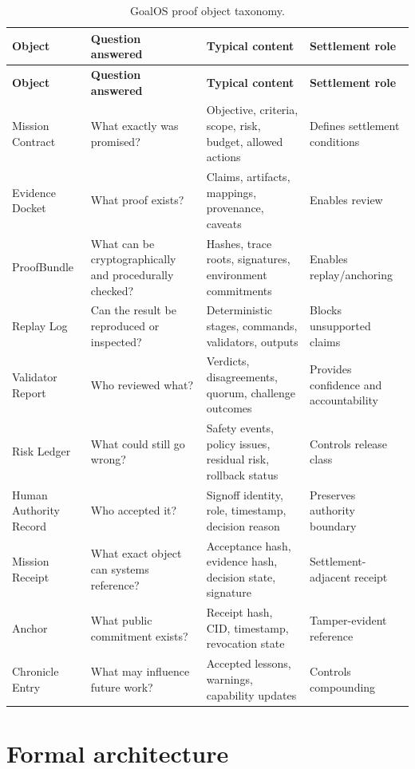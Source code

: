 \begin{longtable}{p{} p{} p{} p{}}
\caption{GoalOS proof object taxonomy.}\label{tab:taxonomy}\\
\toprule
\textbf{Object} & \textbf{Question answered} & \textbf{Typical content} & \textbf{Settlement role}\\
\midrule
\endfirsthead
\toprule
\textbf{Object} & \textbf{Question answered} & \textbf{Typical content} & \textbf{Settlement role}\\
\midrule
\endhead
Mission Contract & What exactly was promised? & Objective, criteria, scope, risk, budget, allowed actions & Defines settlement conditions \\
Evidence Docket & What proof exists? & Claims, artifacts, mappings, provenance, caveats & Enables review \\
ProofBundle & What can be cryptographically and procedurally checked? & Hashes, trace roots, signatures, environment commitments & Enables replay/anchoring \\
Replay Log & Can the result be reproduced or inspected? & Deterministic stages, commands, validators, outputs & Blocks unsupported claims \\
Validator Report & Who reviewed what? & Verdicts, disagreements, quorum, challenge outcomes & Provides confidence and accountability \\
Risk Ledger & What could still go wrong? & Safety events, policy issues, residual risk, rollback status & Controls release class \\
Human Authority Record & Who accepted it? & Signoff identity, role, timestamp, decision reason & Preserves authority boundary \\
Mission Receipt & What exact object can systems reference? & Acceptance hash, evidence hash, decision state, signature & Settlement-adjacent receipt \\
Anchor & What public commitment exists? & Receipt hash, CID, timestamp, revocation state & Tamper-evident reference \\
Chronicle Entry & What may influence future work? & Accepted lessons, warnings, capability updates & Controls compounding \\
\bottomrule
\end{longtable}

\section{Formal architecture}

